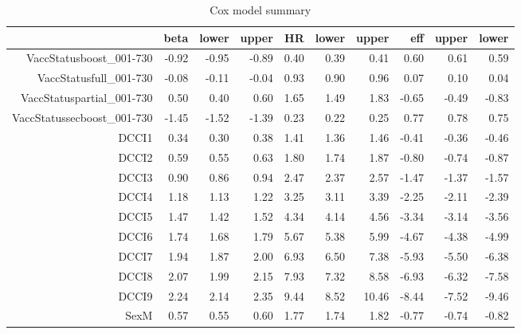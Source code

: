 \begin{table}[ht]
\centering
\begin{tabular}{rrrrrrrrrr}
  \hline
 & beta & lower & upper & HR & lower & upper & eff & upper & lower \\ 
  \hline
VaccStatusboost\_001-730 & -0.92 & -0.95 & -0.89 & 0.40 & 0.39 & 0.41 & 0.60 & 0.61 & 0.59 \\ 
  VaccStatusfull\_001-730 & -0.08 & -0.11 & -0.04 & 0.93 & 0.90 & 0.96 & 0.07 & 0.10 & 0.04 \\ 
  VaccStatuspartial\_001-730 & 0.50 & 0.40 & 0.60 & 1.65 & 1.49 & 1.83 & -0.65 & -0.49 & -0.83 \\ 
  VaccStatussecboost\_001-730 & -1.45 & -1.52 & -1.39 & 0.23 & 0.22 & 0.25 & 0.77 & 0.78 & 0.75 \\ 
  DCCI1 & 0.34 & 0.30 & 0.38 & 1.41 & 1.36 & 1.46 & -0.41 & -0.36 & -0.46 \\ 
  DCCI2 & 0.59 & 0.55 & 0.63 & 1.80 & 1.74 & 1.87 & -0.80 & -0.74 & -0.87 \\ 
  DCCI3 & 0.90 & 0.86 & 0.94 & 2.47 & 2.37 & 2.57 & -1.47 & -1.37 & -1.57 \\ 
  DCCI4 & 1.18 & 1.13 & 1.22 & 3.25 & 3.11 & 3.39 & -2.25 & -2.11 & -2.39 \\ 
  DCCI5 & 1.47 & 1.42 & 1.52 & 4.34 & 4.14 & 4.56 & -3.34 & -3.14 & -3.56 \\ 
  DCCI6 & 1.74 & 1.68 & 1.79 & 5.67 & 5.38 & 5.99 & -4.67 & -4.38 & -4.99 \\ 
  DCCI7 & 1.94 & 1.87 & 2.00 & 6.93 & 6.50 & 7.38 & -5.93 & -5.50 & -6.38 \\ 
  DCCI8 & 2.07 & 1.99 & 2.15 & 7.93 & 7.32 & 8.58 & -6.93 & -6.32 & -7.58 \\ 
  DCCI9 & 2.24 & 2.14 & 2.35 & 9.44 & 8.52 & 10.46 & -8.44 & -7.52 & -9.46 \\ 
  SexM & 0.57 & 0.55 & 0.60 & 1.77 & 1.74 & 1.82 & -0.77 & -0.74 & -0.82 \\ 
   \hline
\end{tabular}
\caption{Cox model summary} 
\end{table}
